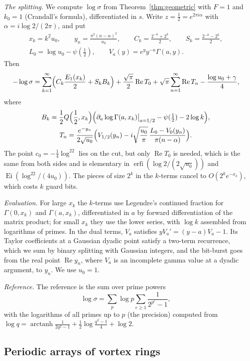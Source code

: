 \documentclass[11pt,reqno]{amsart}
\theoremstyle{definition}
\theoremstyle{remark}
\newcommand{\erfi}{\operatorname{erfi}}
\begin{document}
\emph{The splitting.} We compute $\log\sigma$ from Theorem~\ref{thm:geometric} with $F = 1$ and $k_0 = 1$ (Crandall's
formula), differentiated in $s$. Write $z = \frac12 = e^{2\pi i\alpha}$ with $\alpha = i\log2/(2\pi)$, and put
\begin{gather*}
  x_k = k^2u_0, \qquad y_n = \frac{\pi^2(n-\alpha)^2}{u_0}, \qquad C_k = \frac{2^{-k}+2^k}2, \qquad S_k = \frac{2^{-k}-2^k}2, \\
  L_0 = \log u_0 - \psi(\tfrac12), \qquad V_a(y) = e^yy^{-a}\Gamma(a,y).
\end{gather*}
Then
\[
  -\log\sigma = \sum_{k=1}^{\infty}\Bigl(C_k\frac{E_1(x_k)}2 + S_kB_k\Bigr) + \frac{\sqrt\pi}2\operatorname{Re}T_0
  + \sqrt\pi\sum_{n=1}^{\infty}\operatorname{Re}T_n - \frac{\log u_0 + \gamma}4,
\]
where
\begin{gather*}
  B_k = \frac12Q\Bigl(\frac12,x_k\Bigr)\Bigl(\partial_a\log\Gamma(a,x_k)\big|_{a=1/2} - \psi(\tfrac12) - 2\log k\Bigr), \\
  T_n = \frac{e^{-y_n}}{2\sqrt{u_0}}\Bigl(V_{1/2}(y_n) - i\sqrt{\frac{u_0}\pi}\,\frac{L_0 - V_0(y_n)}{\pi(n-\alpha)}\Bigr).
\end{gather*}
The point $c_0 = -\frac14\log^22$ lies on the cut, but only $\operatorname{Re}T_0$ is needed, which is the same from both
sides and is elementary in $\erfi(\log2/(2\sqrt{u_0}))$ and $\operatorname{Ei}(\log^22/(4u_0))$. The pieces of size $2^k$
in the $k$-terms cancel to $O(2^ke^{-x_k})$, which costs $k$ guard bits.

\emph{Evaluation.} For large $x_k$ the $k$-terms use Legendre's continued fraction for $\Gamma(0,x_k)$ and
$\Gamma(a,x_k)$, differentiated in $a$ by forward differentiation of the matrix product; for small $x_k$ they use the
lower series, with $\log k$ assembled from logarithms of primes. In the dual terms, $V_a$ satisfies
$yV_a' = (y-a)V_a - 1$. Its Taylor coefficients at a Gaussian dyadic point satisfy a two-term recurrence, which we sum
by binary splitting with Gaussian integers, and the bit-burst goes from the real point $\operatorname{Re}y_n$, where
$V_a$ is an incomplete gamma value at a dyadic argument, to $y_n$. We use $u_0 = 1$.

\emph{Reference.} The reference is the sum over prime powers
\[
  \log\sigma = \sum_p\log p\sum_{e\ge1}\frac1{2^{p^e}-1},
\]
with the logarithms of all primes up to $p$ (the precision) computed from
$\log q = \operatorname{arctanh}\frac1{2q^2-1} + \frac12\log\frac{q^2-1}{4} + \log 2$.

\subsection{Periodic arrays of vortex rings}\label{sec:vortex}
\end{document}
